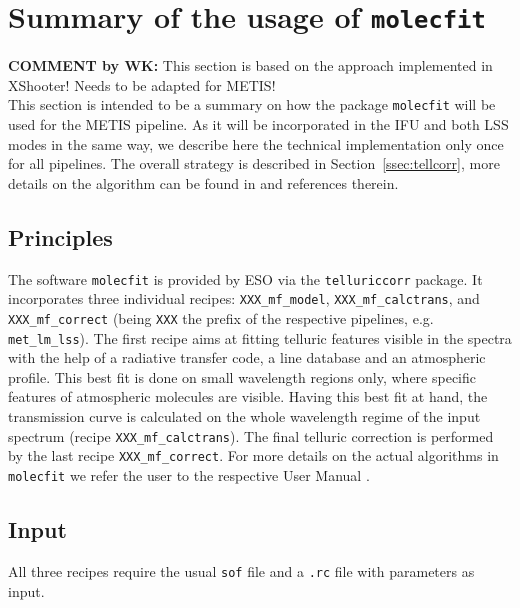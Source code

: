 \section{Summary of the usage of \texttt{molecfit}}\label{app:mf}
\textbf{COMMENT by WK:} This section is based on the approach implemented in XShooter! Needs to be adapted for METIS!\\[1cm]


This section is intended to be a summary on how the package \texttt{molecfit} will be used for the \ac{METIS} pipeline. As it will be incorporated in the \ac{IFU} and both \ac{LSS} modes in the same way, we describe here the technical implementation only once for all pipelines. The overall strategy is described in Section~\ref{ssec:tellcorr}, more details on the \mf algorithm can be found in \cite{molecfit} and references therein.

\subsection{Principles}\label{app:mf_principles}
The software \texttt{molecfit} is provided by \ac{ESO} via the \texttt{telluriccorr} package. It incorporates three individual recipes: \texttt{XXX\_mf\_model}, \texttt{XXX\_mf\_calctrans}, and \texttt{XXX\_mf\_correct} (being \texttt{XXX} the prefix of the respective pipelines, e.g. \texttt{met\_lm\_lss}). The first recipe aims at fitting telluric features visible in the spectra with the help of a radiative transfer code, a line database and an atmospheric profile. This best fit is done on small wavelength regions only, where specific features of atmospheric molecules are visible. Having this best fit at hand, the transmission curve is calculated on the whole wavelength regime of the input spectrum (recipe \texttt{XXX\_mf\_calctrans}). The final telluric correction is performed by the last recipe \texttt{XXX\_mf\_correct}. For more details on the actual algorithms in \texttt{molecfit} we refer the user to the respective User Manual \cite{molecfit}.\\

\subsection{Input}\label{app:mf_input}
All three recipes require the usual \texttt{sof} file and a \texttt{.rc} file with parameters as input.
